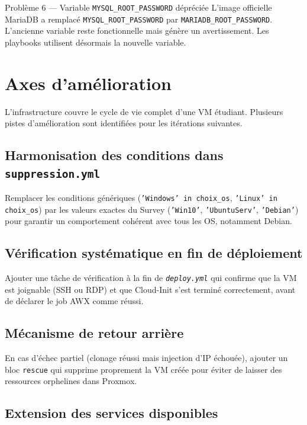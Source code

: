 \documentclass[a4paper]{article}
\newcommand{\cmd}[1]{\texttt{#1}}
\newcommand{\file}[1]{\texttt{\textit{#1}}}
\begin{document}
\begin{stepbox}{Problème 6 --- Variable \texttt{MYSQL\_ROOT\_PASSWORD} dépréciée}
  L'image officielle MariaDB a remplacé \cmd{MYSQL\_ROOT\_PASSWORD} par \cmd{MARIADB\_ROOT\_PASSWORD}. L'ancienne variable reste fonctionnelle mais génère un avertissement. Les playbooks utilisent désormais la nouvelle variable.
\end{stepbox}


\section{Axes d'amélioration}

L'infrastructure couvre le cycle de vie complet d'une VM étudiant. Plusieurs pistes d'amélioration sont identifiées pour les itérations suivantes.

\subsection{Harmonisation des conditions dans \texttt{suppression.yml}}

Remplacer les conditions génériques (\cmd{'Windows' in choix\_os}, \cmd{'Linux' in choix\_os}) par les valeurs exactes du Survey (\cmd{'Win10'}, \cmd{'UbuntuServ'}, \cmd{'Debian'}) pour garantir un comportement cohérent avec tous les OS, notamment Debian.

\subsection{Vérification systématique en fin de déploiement}

Ajouter une tâche de vérification à la fin de \file{deploy.yml} qui confirme que la VM est joignable (SSH ou RDP) et que Cloud-Init s'est terminé correctement, avant de déclarer le job AWX comme réussi.

\subsection{Mécanisme de retour arrière}

En cas d'échec partiel (clonage réussi mais injection d'IP échouée), ajouter un bloc \cmd{rescue} qui supprime proprement la VM créée pour éviter de laisser des ressources orphelines dans Proxmox.

\subsection{Extension des services disponibles}
\end{document}
